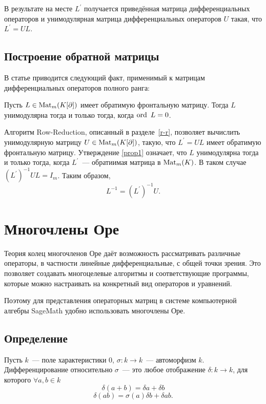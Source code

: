         В результате на месте $L^{'}$ получается приведённая матрица дифференциальных операторов и
        унимодулярная матрица дифференциальных операторов $U$ такая, что $L^{'}=UL$.
    \subsection{Построение обратной матрицы}
        \label{rev}
        В статье \cite{abr_bark} приводится следующий факт, применимый к матрицам 
        дифференциальных операторов полного ранга:
        \begin{proposition}
            \label{prop1}
            Пусть $L\in \mathop{\mathrm{Mat}}\nolimits_m(K[\partial])$ имеет обратимую фронтальную матрицу. Тогда
            $L$ унимодулярна тогда и только тогда, когда $\mathop{\mathrm{ord}}\nolimits~L=0$.
        \end{proposition}


        Алгоритм Row-Reduction, описанный в разделе~\ref{r-r}, позволяет вычислить унимодулярную матрицу $U\in \mathop{\mathrm{Mat}}\nolimits_m(K[\partial])$,
        такую, что $L^{'}=UL$ имеет обратимую фронтальную матрицу. Утверждение \ref{prop1}
        означает, что $L$ унимодулярна тогда и только тогда, когда $L^{'}$~--- обратиимая матрица в 
        $\mathop{\mathrm{Mat}}\nolimits_m(K)$. В таком случае $(L^{'})^{-1}UL=I_m$. Таким образом, 
        \begin{equation}
            \label{form}
            L^{-1}=(L^{'})^{-1}U.
        \end{equation}


\newpage
\section{Многочлены Оре}
    Теория колец многочленов Оре даёт возможность рассматривать различные 
    операторы, в частности линейные дифференциальные, с общей точки зрения. Это 
    позволяет создавать многоцелевые алгоритмы и соответствующие программы, 
    которые можно настраивать на конкретный вид операторов и уравнений. 


    Поэтому для представления операторных матриц в системе компьютерной алгебры SageMath 
    удобно использовать многочлены Оре.
    \subsection{Определение}
        Пусть $k$~--- поле характеристики 0, $\sigma: k \rightarrow k$~---
        автоморфизм $k$. Дифференцирование относительно $\sigma$~--- это любое отображение
        $\delta: k \rightarrow k$, для которого $\forall a,b \in k$
            $$\delta(a+b)=\delta a+\delta b$$
            $$\delta(ab)=\sigma(a)\delta b+\delta a b.$$


